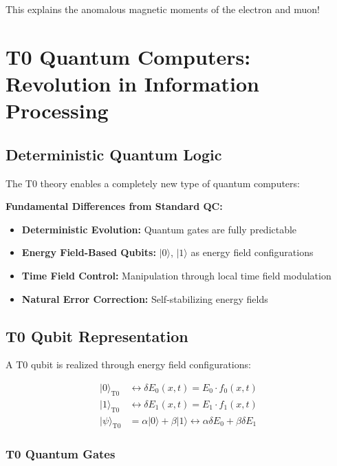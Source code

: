 \documentclass[12pt,a4paper]{article}
\newcommand{\deltaE}{\delta E}
\begin{document}
	This explains the anomalous magnetic moments of the electron and muon!
	
	\section{T0 Quantum Computers: Revolution in Information Processing}
	
	\subsection{Deterministic Quantum Logic}
	
	The T0 theory enables a completely new type of quantum computers:
	
	\begin{tcolorbox}[colback=yellow!5!white,colframe=yellow!75!black,title={T0 Quantum Computer Principles}]
		\textbf{Fundamental Differences from Standard QC:}
		\begin{itemize}
			\item \textbf{Deterministic Evolution:} Quantum gates are fully predictable
			\item \textbf{Energy Field-Based Qubits:} $|0\rangle$, $|1\rangle$ as energy field configurations
			\item \textbf{Time Field Control:} Manipulation through local time field modulation
			\item \textbf{Natural Error Correction:} Self-stabilizing energy fields
		\end{itemize}
	\end{tcolorbox}
	
	\subsection{T0 Qubit Representation}
	
	A T0 qubit is realized through energy field configurations:
	
	\begin{align}
		|0\rangle_{\text{T0}} &\leftrightarrow \deltaE_0(x,t) = E_0 \cdot f_0(x,t) \\
		|1\rangle_{\text{T0}} &\leftrightarrow \deltaE_1(x,t) = E_1 \cdot f_1(x,t) \\
		|\psi\rangle_{\text{T0}} &= \alpha|0\rangle + \beta|1\rangle \leftrightarrow \alpha\deltaE_0 + \beta\deltaE_1
	\end{align}
	
	\subsubsection{T0 Quantum Gates}
	
\end{document}
